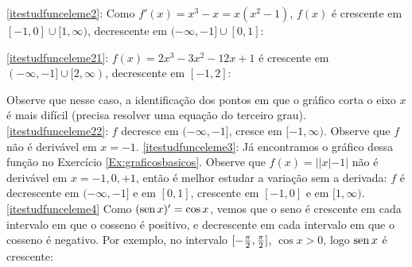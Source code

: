 \begin{exo}
\begin{sol}
\eqref{itestudfunceleme2}: Como $f'(x)=x^3-x=x(x^2-1)$,
$f(x)$ é crescente em $[-1,0]\cup [1,\infty)$,
decrescente em $(-\infty,-1]\cup[0,1]$:
\begin{center}
\begin{bmlimage}\end{bmlimage}
\end{center}
\eqref{itestudfunceleme21}: $f(x)=2x^3-3x^2-12x+1$ é 
crescente em $(-\infty,-1]\cup[2,\infty)$, decrescente em $[-1,2]$:
\begin{center}
\begin{bmlimage}\end{bmlimage}
\end{center}
Observe que nesse caso, a identificação dos pontos em que o gráfico corta o
eixo $x$ é mais difícil (precisa resolver uma equação do terceiro grau).
\eqref{itestudfunceleme22}: $f$ decresce em $(-\infty,-1]$, cresce em
$[-1,\infty)$. Observe que $f$ não é derivável em $x=-1$.
\eqref{itestudfunceleme3}: Já encontramos o gráfico dessa função no Exercício
\ref{Ex:graficosbasicos}. Observe que 
$f(x)=||x|-1|$ não é derivável em $x=-1,0,+1$, então é melhor estudar a variação
sem a derivada: $f$ é decrescente em $(-\infty,-1]$ e em $[0,1]$,
crescente em $[-1,0]$ e em $[1,\infty)$.
\eqref{itestudfunceleme4} Como $(\operatorname{sen} x)'=\cos x$, vemos que o seno é crescente
em cada intervalo em que o cosseno é positivo, e decrescente em cada intervalo
em que o cosseno é negativo. Por exemplo, no intervalo $[-\tfrac{\pi}{2},
\tfrac{\pi}{2}]$, $\cos x>0$, logo $\operatorname{sen} x$ é crescente:

\end{sol}
\end{exo}
